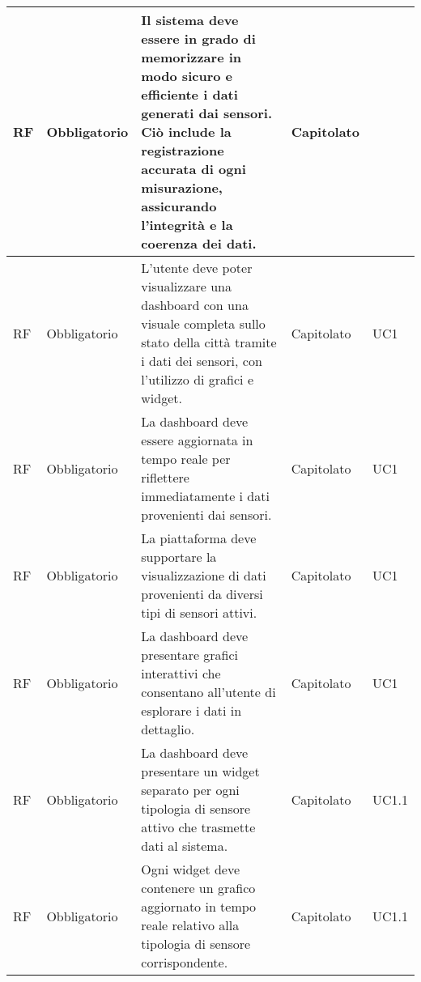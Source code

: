 \begin{longtable}{|C{1cm}|C{2cm}|>{\raggedright}m{5cm}|C{2cm}|C{1.5cm}|}
     RF & Obbligatorio        & Il sistema deve essere in grado di memorizzare in modo sicuro e efficiente i dati generati dai sensori. Ciò include la registrazione accurata di ogni misurazione, assicurando l'integrità e la coerenza dei dati.                                                                                                                                                                        & Capitolato      &                     \\
    \hline
     RF & Obbligatorio        & L'utente deve poter visualizzare una dashboard con una visuale completa sullo stato della città tramite \newline i dati dei sensori, con l'utilizzo di grafici e widget.                                                             & Capitolato      & UC1          \\
    \hline
     RF & Obbligatorio        & La dashboard deve essere aggiornata in tempo reale per riflettere immediatamente i dati provenienti dai sensori.                                                                                                                   & Capitolato      & UC1               \\
    \hline
     RF & Obbligatorio        & La piattaforma deve supportare la visualizzazione di dati provenienti da diversi tipi di sensori attivi.                                                                                                                           & Capitolato      & UC1               \\
    \hline
     RF & Obbligatorio        & La dashboard deve presentare grafici interattivi che consentano all'utente di esplorare i dati in dettaglio.                                                                                                                       & Capitolato      & UC1               \\
    \hline
     RF & Obbligatorio        & La dashboard deve presentare un widget separato per ogni tipologia di sensore attivo che trasmette dati al sistema.                                                                                                                & Capitolato      & UC1.1               \\
    \hline
     RF & Obbligatorio        & Ogni widget deve contenere un grafico aggiornato in tempo reale relativo alla tipologia di sensore corrispondente.                                                                                                                 & Capitolato      & UC1.1               \\

\end{longtable}
